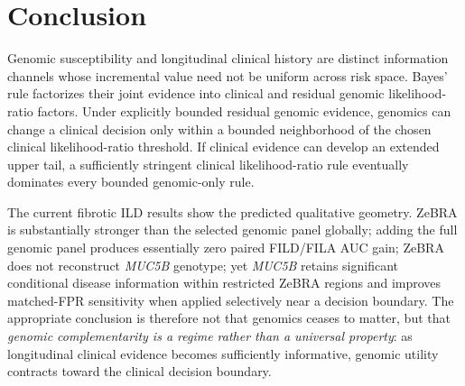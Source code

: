 \documentclass[journal]{IEEEtran}
\begin{document}
\section{Conclusion}

Genomic susceptibility and longitudinal clinical history are distinct information channels whose incremental value need not be uniform across risk space. Bayes' rule factorizes their joint evidence into clinical and residual genomic likelihood-ratio factors. Under explicitly bounded residual genomic evidence, genomics can change a clinical decision only within a bounded neighborhood of the chosen clinical likelihood-ratio threshold. If clinical evidence can develop an extended upper tail, a sufficiently stringent clinical likelihood-ratio rule eventually dominates every bounded genomic-only rule.

The current fibrotic ILD results show the predicted qualitative geometry. ZeBRA is substantially stronger than the selected genomic panel globally; adding the full genomic panel produces essentially zero paired FILD/FILA AUC gain; ZeBRA does not reconstruct \textit{MUC5B} genotype; yet \textit{MUC5B} retains significant conditional disease information within restricted ZeBRA regions and improves matched-FPR sensitivity when applied selectively near a decision boundary. The appropriate conclusion is therefore not that genomics ceases to matter, but that \emph{genomic complementarity is a regime rather than a universal property}: as longitudinal clinical evidence becomes sufficiently informative, genomic utility contracts toward the clinical decision boundary.
\end{document}
